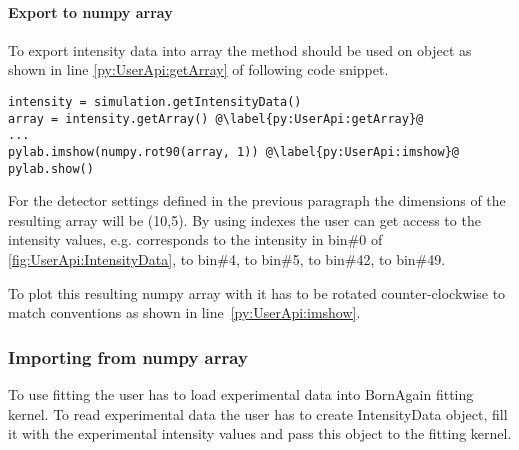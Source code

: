 \paragraph{Export to numpy array}

To export intensity data into   array the method  should be used
on  object as shown in line \ref{py:UserApi:getArray} of
following code snippet.

\begin{lstlisting}
intensity = simulation.getIntensityData()
array = intensity.getArray() @\label{py:UserApi:getArray}@
...
pylab.imshow(numpy.rot90(array, 1)) @\label{py:UserApi:imshow}@
pylab.show()
\end{lstlisting}

For the detector settings defined in the previous paragraph the dimensions of the resulting array will be (10,5). By using  indexes the user can get access to the intensity values, e.g.
 corresponds to the intensity in bin\#0 of \cref{fig:UserApi:IntensityData},
 to bin\#4,
 to bin\#5,
 to bin\#42,
 to bin\#49.


To plot this resulting numpy array with  it has to be rotated counter-clockwise
to match  conventions as shown in line~\ref{py:UserApi:imshow}.





\subsubsection{Importing from numpy array}

To use fitting the user has to load experimental data into BornAgain fitting kernel.
To read experimental data the user has to create
IntensityData object, fill it with the experimental  intensity values and pass
this object to the fitting kernel.

